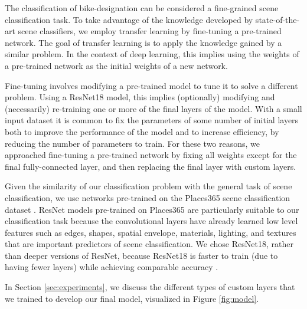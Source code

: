 \documentclass[10pt,twocolumn,letterpaper]{article}
\begin{document}
The classification of bike-designation can be considered a fine-grained scene classification task. To take advantage of the knowledge developed by state-of-the-art scene classifiers, we employ transfer learning by fine-tuning a pre-trained network. The goal of transfer learning is to apply the knowledge gained by a similar problem. In the context of deep learning, this implies using the weights of a pre-trained network as the initial weights of a new network. 

Fine-tuning involves modifying a pre-trained model to tune it to solve a different problem. Using a ResNet18 model, this implies (optionally) modifying and (necessarily) re-training one or more of the final layers of the model. With a small input dataset it is common to fix the parameters of some number of initial layers both to improve the performance of the model and to increase efficiency, by reducing the number of parameters to train. For these two reasons, we approached fine-tuning a pre-trained network by fixing all weights except for the final fully-connected layer, and then replacing the final layer with custom layers.

Given the similarity of our classification problem with the general task of scene classification, we use networks pre-trained on the Places365 scene classification dataset \cite{zhou2017places}. ResNet models pre-trained on Places365 are particularly suitable to our classification task because the convolutional layers have already learned low level features such as edges, shapes, spatial envelope, materials, lighting, and textures that are important predictors of scene classification. We chose ResNet18, rather than deeper versions of ResNet, because ResNet18 is faster to train (due to having fewer layers) while achieving comparable accuracy \cite{zhou2017places}.

In Section \ref{sec:experiments}, we discuss the different types of custom layers that we trained to develop our final model, visualized in Figure \ref{fig:model}.
\end{document}
